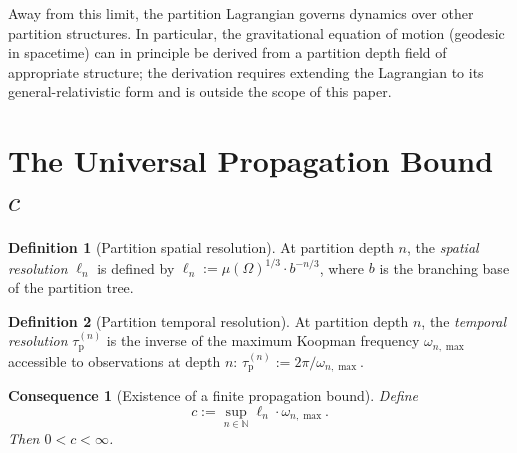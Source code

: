 \documentclass[11pt,twocolumn,a4paper]{article}
\theoremstyle{axiomstyle}
\theoremstyle{conseqstyle}
\newtheorem{consequence}{Consequence}
\theoremstyle{definition}
\newtheorem{definition}{Definition}
\theoremstyle{remark}
\newcommand{\Natural}{\mathbb{N}}
\newcommand{\taup}{\tau_{\mathrm{p}}}
\begin{document}
Away from this limit, the partition Lagrangian governs dynamics over other partition structures. In particular, the gravitational equation of motion (geodesic in spacetime) can in principle be derived from a partition depth field of appropriate structure; the derivation requires extending the Lagrangian to its general-relativistic form and is outside the scope of this paper.

\section{The Universal Propagation Bound $c$}
\label{sec:propagationbound}

\begin{definition}[Partition spatial resolution]
\label{def:partitionspatial}
At partition depth $n$, the \emph{spatial resolution} $\ell_{n}$ is defined by $\ell_{n}:=\mu(\Omega)^{1/3}\cdot b^{-n/3}$, where $b$ is the branching base of the partition tree.
\end{definition}

\begin{definition}[Partition temporal resolution]
\label{def:partitiontemporal}
At partition depth $n$, the \emph{temporal resolution} $\taup^{(n)}$ is the inverse of the maximum Koopman frequency $\omega_{n,\max}$ accessible to observations at depth $n$: $\taup^{(n)}:=2\pi/\omega_{n,\max}$.
\end{definition}

\begin{consequence}[Existence of a finite propagation bound]
\label{cons:propagationbound}
Define
\begin{equation}
c:=\sup_{n\in\Natural}\ell_{n}\cdot\omega_{n,\max}.
\label{eq:cdef}
\end{equation}
Then $0<c<\infty$.
\end{consequence}
\end{document}
